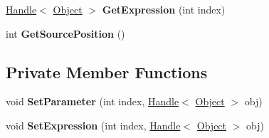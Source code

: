\begin{DoxyCompactItemize}
\item 
\hyperlink{classv8_1_1internal_1_1_handle}{Handle}$<$ \hyperlink{classv8_1_1internal_1_1_object}{Object} $>$ {\bfseries Get\+Expression} (int index)\hypertarget{classv8_1_1internal_1_1_deoptimized_frame_info_ae2ada6861a34add80240b68c5f6ec2d1}{}\label{classv8_1_1internal_1_1_deoptimized_frame_info_ae2ada6861a34add80240b68c5f6ec2d1}

\item 
int {\bfseries Get\+Source\+Position} ()\hypertarget{classv8_1_1internal_1_1_deoptimized_frame_info_a1f7e7515df0cf92d77692f3861eeab5a}{}\label{classv8_1_1internal_1_1_deoptimized_frame_info_a1f7e7515df0cf92d77692f3861eeab5a}

\end{DoxyCompactItemize}
\subsection*{Private Member Functions}
\begin{DoxyCompactItemize}
\item 
void {\bfseries Set\+Parameter} (int index, \hyperlink{classv8_1_1internal_1_1_handle}{Handle}$<$ \hyperlink{classv8_1_1internal_1_1_object}{Object} $>$ obj)\hypertarget{classv8_1_1internal_1_1_deoptimized_frame_info_a3f30040618f126bca31d06ae16ef70d5}{}\label{classv8_1_1internal_1_1_deoptimized_frame_info_a3f30040618f126bca31d06ae16ef70d5}

\item 
void {\bfseries Set\+Expression} (int index, \hyperlink{classv8_1_1internal_1_1_handle}{Handle}$<$ \hyperlink{classv8_1_1internal_1_1_object}{Object} $>$ obj)\hypertarget{classv8_1_1internal_1_1_deoptimized_frame_info_a813e61e137504e75a5c8f19d5815715d}{}\label{classv8_1_1internal_1_1_deoptimized_frame_info_a813e61e137504e75a5c8f19d5815715d}

\end{DoxyCompactItemize}
